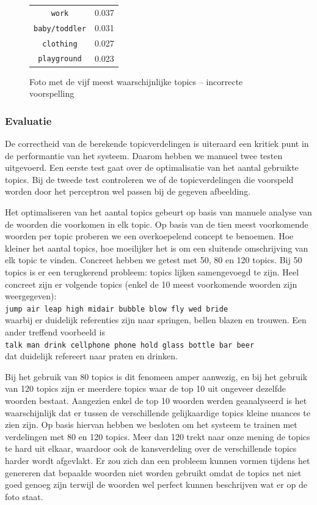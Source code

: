 \begin{figure}[h]
\begin{minipage}[t]{.5\textwidth}
\begin{tabular}{cl}
            \texttt{work}                   & 0.037 \\
            \texttt{baby/toddler}                 & 0.031 \\
            \texttt{clothing}           & 0.027 \\
            \texttt{playground}        & 0.023\\
            \hline
        \end{tabular}
    \end{minipage}
    \caption{Foto met de vijf meest waarschijnlijke topics -- incorrecte voorspelling}
    \label{fig:wrongldalearning}
\end{figure}

\subsubsection{Evaluatie}
\label{subs:Evaluatie}
De correctheid van de berekende topicverdelingen is uiteraard een kritiek punt in de performantie van het systeem. Daarom hebben we manueel twee testen uitgevoerd. Een eerste test gaat over de optimalisatie van het aantal gebruikte topics. Bij de tweede test controleren we of de topicverdelingen die voorspeld worden door het perceptron wel passen bij de gegeven afbeelding.

Het optimaliseren van het aantal topics gebeurt op basis van manuele analyse van de woorden die voorkomen in elk topic. Op basis van de tien meest voorkomende woorden per topic proberen we een overkoepelend concept te benoemen. Hoe kleiner het aantal topics, hoe moeilijker het is om een sluitende omschrijving van elk topic te vinden. Concreet hebben we getest met 50, 80 en 120 topics. Bij 50 topics is er een terugkerend probleem: topics lijken samengevoegd te zijn. Heel concreet zijn er volgende topics (enkel de 10 meest voorkomende woorden zijn weergegeven): \\
\texttt{jump air leap high midair bubble blow fly wed bride}
\\
waarbij er duidelijk referenties zijn naar springen, bellen blazen en trouwen. Een ander treffend voorbeeld is \\
\texttt{talk man drink cellphone phone hold glass bottle bar beer}
\\ dat duidelijk refereert naar praten en drinken.

Bij het gebruik van 80 topics is dit fenomeen amper aanwezig, en bij het gebruik van 120 topics zijn er meerdere topics waar de top 10 uit ongeveer dezelfde woorden bestaat. Aangezien enkel de top 10 woorden werden geanalyseerd is het waarschijnlijk dat er tussen de verschillende gelijkaardige topics kleine nuances te zien zijn. Op basis hiervan hebben we besloten om het systeem te trainen met verdelingen met 80 en 120 topics. Meer dan 120 trekt naar onze mening de topics te hard uit elkaar, waardoor ook de kansverdeling over de verschillende topics harder wordt afgevlakt. Er zou zich dan een probleem kunnen vormen tijdens het genereren dat bepaalde woorden niet worden gebruikt omdat de topics net niet goed genoeg zijn terwijl de woorden wel perfect kunnen beschrijven wat er op de foto staat.

